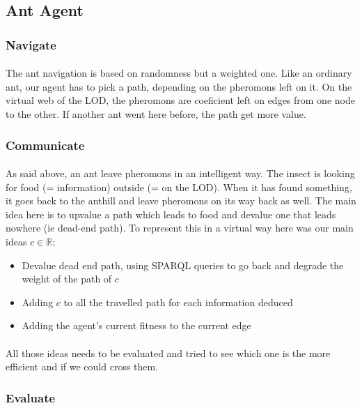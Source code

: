 \documentclass{article}
\newenvironment{itemh}[0]{\begin{itemize}[label=$\heartsuit$, font=\color{mygray} \small]}{\end{itemize}}
\begin{document}
	\subsection{Ant Agent}
		\subsubsection{Navigate}
			\paragraph{}
			The ant navigation is based on randomness but a weighted one.
			Like an ordinary ant, our agent has to pick a path, depending on the pheromons left on it.
			On the virtual web of the LOD, the pheromons are coeficient left on edges from one node to the other.
			If another ant went here before, the path get more value.			
		\subsubsection{Communicate}
			\paragraph{}
			As said above, an ant leave pheromons in an intelligent way.
			The insect is looking for food (= information) outside (= on the LOD).
			When it has found something, it goes back to the anthill and leave pheromons on its way back as well.
			The main idea here is to upvalue a path which leads to food and devalue one that leads nowhere (ie dead-end path).
			To represent this in a virtual way here was our main ideas $c \in \mathbb{R}$:
			\begin{itemh}
				\item Devalue dead end path, using SPARQL queries to go back and degrade the weight of the path of $c$
				\item Adding $c$ to all the travelled path for each information deduced
				\item Adding the agent's current fitness to the current edge
			\end{itemh}
			\paragraph{}
				All those ideas needs to be evaluated and tried to see which one is the more efficient and if we could cross them.
		\subsubsection{Evaluate}
\end{document}
